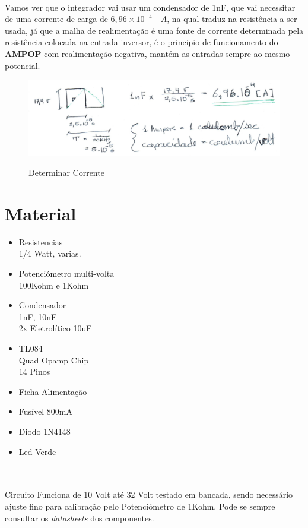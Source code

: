 \\
Vamos ver que o integrador vai usar um condensador de 1nF, que vai necessitar de uma corrente de carga de $6,96 \times 10^{-4} \quad A$, na qual traduz na resistência a ser usada, já que a malha de realimentação é uma fonte de corrente determinada pela resistência colocada na entrada inversor, é o principio de funcionamento do {\bf AMPOP} com realimentação negativa, mantém as entradas sempre ao mesmo potencial.
\begin{figure}[H]
	\includegraphics[scale=0.9]{./image/trb3calc_1.jpg}\\
	\caption{Determinar Corrente}
\end{figure}
\section{Material}
\begin{minipage}[t]{.4\linewidth}
	\begin{itemize}
		\setlength\itemsep{-0.5em}
		\item Resistencias \\
		1/4 Watt, varias.
		\item Potenciómetro multi-volta \\
		100Kohm e 1Kohm
		\item Condensador \\
		1nF, 10nF  \\
		2x Eletrolítico 10uF
		
	\end{itemize}
\end{minipage}
\begin{minipage}[t]{.31\linewidth}
	\begin{itemize}
		\setlength\itemsep{-0.5em}
		\item TL084 \\
		Quad Opamp Chip \\
		14 Pinos
		\item Ficha Alimentação
		\item Fusível 800mA
		\item Diodo 1N4148
		\item Led Verde \\
	\end{itemize}
\end{minipage}\\
\\
Circuito Funciona de 10 Volt até 32 Volt testado em bancada, sendo necessário ajuste fino para calibração pelo Potenciómetro de  1Kohm.
Pode se sempre consultar os {\it datasheets} dos componentes.

